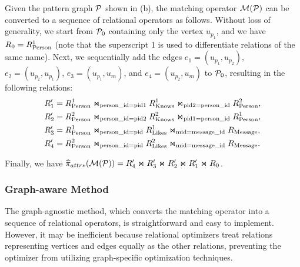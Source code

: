 \begin{example}
  Given the pattern graph $\mathcal{P}$ shown in (b), the matching operator $\mathcal{M}(\mathcal{P})$ can be converted to a sequence of relational operators as follows. Without loss of generality, we start from $\mathcal{P}_0$ containing only the vertex $u_{p_1}$, and we have ${R_{0}} = {R^{1}_{\text{Person}}}$ (note that the superscript 1 is used to differentiate relations of the same name).
  Next, we sequentially add the edges $e_1 = (u_{p_1}, u_{p_2})$, $e_2 = (u_{p_2}, u_{p_1})$, $e_3 = (u_{p_1}, u_m)$, and $e_4 = (u_{p_2}, u_m)$ to $\mathcal{P}_0$, resulting in the following relations:
  \begin{equation*}
    \begin{split}
    R'_1 &= {R^{1}_{\text{Person}}} \Join_{\text{person\_id}=\text{pid1}} {R^{1}_{\text{Knows}}} \Join_{\text{pid2}=\text{person\_id}} {R^{2}_{\text{Person}}}, \\
    R'_2 &= {R^{2}_{\text{Person}}} \Join_{\text{person\_id}=\text{pid2}} {R^{2}_{\text{Knows}}} \Join_{\text{pid1}=\text{person\_id}} {R^{1}_{\text{Person}}}, \\
    R'_3 &= {R^{1}_{\text{Person}}} \Join_{\text{person\_id}=\text{pid}} {R^{1}_{\text{Likes}}} \Join_{\text{mid}=\text{message\_id}} {R_{\text{Message}}}, \\
    R'_4 &= {R^{2}_{\text{Person}}} \Join_{\text{person\_id}=\text{pid}} {R^{2}_{\text{Likes}}} \Join_{\text{mid}=\text{message\_id}} {R_{\text{Message}}}.
    \end{split}
    \end{equation*}

    Finally, we have $\widehat{\pi}_{attr*}(\mathcal{M}(\mathcal{P})) = R'_4 \Join R'_3 \Join R'_2 \Join R'_1 \Join {\ensuremath R_{0}}$.

\end{example}

\subsubsection{Graph-aware Method}
\label{sec:graph-aware}
The graph-agnostic method, which converts the matching operator into a sequence of relational operators, is straightforward and easy to implement. However, it may be inefficient because relational optimizers treat relations representing vertices and edges equally as the other relations, preventing the optimizer from utilizing graph-specific optimization techniques. %

